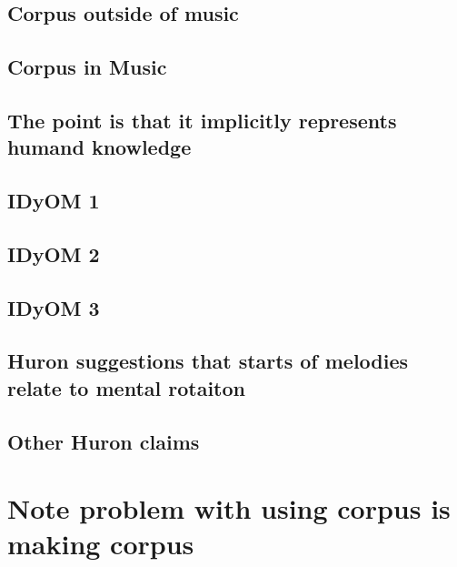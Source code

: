 \documentclass[]{book}
\theoremstyle{definition}
\theoremstyle{definition}
\theoremstyle{definition}
\theoremstyle{remark}
\begin{document}
\hypertarget{corpus-outside-of-music}{%
\subsection{Corpus outside of music}\label{corpus-outside-of-music}}

\hypertarget{corpus-in-music}{%
\subsection{Corpus in Music}\label{corpus-in-music}}

\hypertarget{the-point-is-that-it-implicitly-represents-humand-knowledge}{%
\subsection{The point is that it implicitly represents humand
knowledge}\label{the-point-is-that-it-implicitly-represents-humand-knowledge}}

\hypertarget{idyom-1}{%
\subsection{IDyOM 1}\label{idyom-1}}

\hypertarget{idyom-2}{%
\subsection{IDyOM 2}\label{idyom-2}}

\hypertarget{idyom-3}{%
\subsection{IDyOM 3}\label{idyom-3}}

\hypertarget{huron-suggestions-that-starts-of-melodies-relate-to-mental-rotaiton}{%
\subsection{Huron suggestions that starts of melodies relate to mental
rotaiton}\label{huron-suggestions-that-starts-of-melodies-relate-to-mental-rotaiton}}

\hypertarget{other-huron-claims}{%
\subsection{Other Huron claims}\label{other-huron-claims}}

\hypertarget{note-problem-with-using-corpus-is-making-corpus}{%
\section{Note problem with using corpus is making
corpus}\label{note-problem-with-using-corpus-is-making-corpus}}
\end{document}
